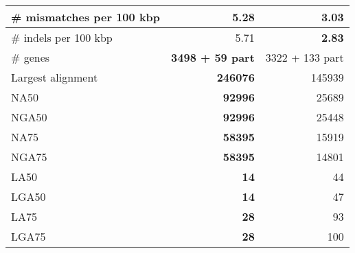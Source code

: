 \documentclass[12pt,a4paper]{article}
\begin{document}
\begin{table}[ht]
\begin{center}
\begin{tabular}{|l*{2}{|r}|}
\# mismatches per 100 kbp & 5.28 & {\bf 3.03} \\ \hline
\# indels per 100 kbp & 5.71 & {\bf 2.83} \\ \hline
\# genes & {\bf 3498 + 59 part} & 3322 + 133 part \\ \hline
Largest alignment & {\bf 246076} & 145939 \\ \hline
NA50 & {\bf 92996} & 25689 \\ \hline
NGA50 & {\bf 92996} & 25448 \\ \hline
NA75 & {\bf 58395} & 15919 \\ \hline
NGA75 & {\bf 58395} & 14801 \\ \hline
LA50 & {\bf 14} & 44 \\ \hline
LGA50 & {\bf 14} & 47 \\ \hline
LA75 & {\bf 28} & 93 \\ \hline
LGA75 & {\bf 28} & 100 \\ \hline
\end{tabular}
\end{center}
\end{table}
\end{document}
